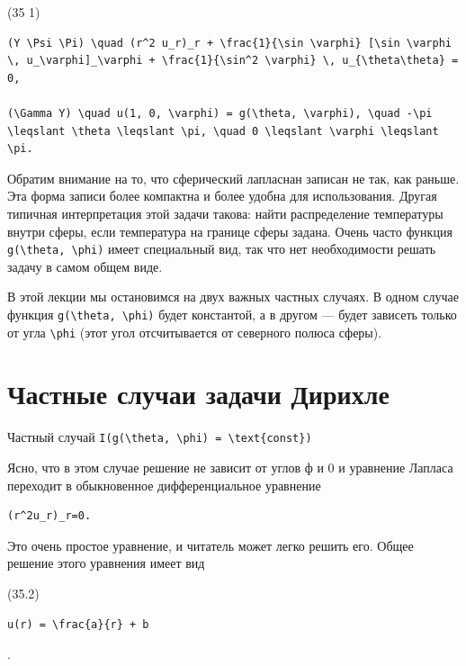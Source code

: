\documentclass[
  ukrainian,
]{article}
\begin{document}
(35 1)

\begin{verbatim}
(Y \Psi \Pi) \quad (r^2 u_r)_r + \frac{1}{\sin \varphi} [\sin \varphi \, u_\varphi]_\varphi + \frac{1}{\sin^2 \varphi} \, u_{\theta\theta} = 0,

(\Gamma Y) \quad u(1, 0, \varphi) = g(\theta, \varphi), \quad -\pi \leqslant \theta \leqslant \pi, \quad 0 \leqslant \varphi \leqslant \pi.
\end{verbatim}

Обратим внимание на то, что сферический лапласнан записан не так, как
раньше. Эта форма записи более компактна и более удобна для
использования. Другая типичная интерпретация этой задачи такова: найти
распределение температуры внутри сферы, если температура на границе
сферы задана. Очень часто функция
\texttt{g(\textbackslash{}theta,\ \textbackslash{}phi)} имеет
специальный вид, так что нет необходимости решать задачу в самом общем
виде.

В этой лекции мы остановимся на двух важных частных случаях. В одном
случае функция \texttt{g(\textbackslash{}theta,\ \textbackslash{}phi)}
будет константой, а в другом --- будет зависеть только от угла
\texttt{\textbackslash{}phi} (этот угол отсчитывается от северного
полюса сферы).

\section{Частные случаи задачи
Дирихле}\label{ux447ux430ux441ux442ux43dux44bux435-ux441ux43bux443ux447ux430ux438-ux437ux430ux434ux430ux447ux438-ux434ux438ux440ux438ux445ux43bux435}

Частный случай
\texttt{I(g(\textbackslash{}theta,\ \textbackslash{}phi)\ =\ \textbackslash{}text\{const\})}

Ясно, что в этом случае решение не зависит от углов ф и 0 и уравнение
Лапласа переходит в обыкновенное дифференциальное уравнение

\begin{verbatim}
(r^2u_r)_r=0.
\end{verbatim}

Это очень простое уравнение, и читатель может легко решить его. Общее
решение этого уравнения имеет вид

(35.2)

\begin{verbatim}
u(r) = \frac{a}{r} + b
\end{verbatim}

.
\end{document}
